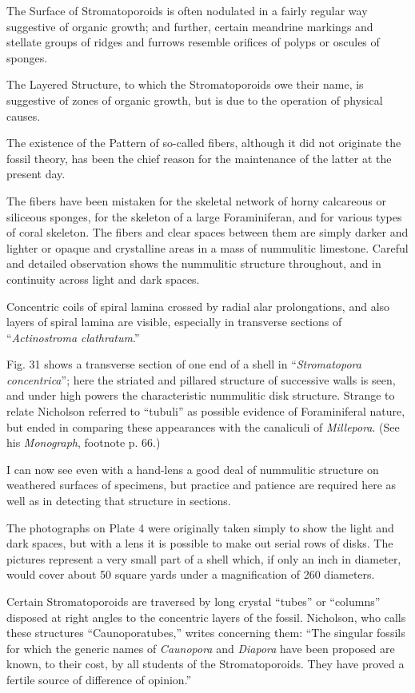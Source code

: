\documentclass[a4paper, 12pt, oneside]{article}
\begin{document}
The Surface of Stromatoporoids is often nodulated in a fairly regular way suggestive of organic growth; and further, certain meandrine markings and stellate groups of ridges and furrows resemble orifices of polyps or oscules of sponges.

The Layered Structure, to which the Stromatoporoids owe their name, is suggestive of zones of organic growth, but is due to the operation of physical causes.

The existence of the Pattern of so-called fibers, although it did not originate the fossil theory, has been the chief reason for the maintenance of the latter at the present day.

The fibers have been mistaken for the skeletal network of horny calcareous or siliceous sponges, for the skeleton of a large Foraminiferan, and for various types of coral skeleton. The fibers and clear spaces between them are simply darker and lighter or opaque and crystalline areas in a mass of nummulitic limestone. Careful and detailed observation shows the nummulitic structure throughout, and in continuity across light and dark spaces.

Concentric coils of spiral lamina crossed by radial alar prolongations, and also layers of spiral lamina are visible, especially in transverse sections of ``\emph{Actinostroma clathratum}.''

Fig. 31 shows a transverse section of one end of a shell in ``\emph{Stromatopora concentrica}''; here the striated and pillared structure of successive walls is seen, and under high powers the characteristic nummulitic disk structure. Strange to relate Nicholson referred to ``tubuli'' as possible evidence of Foraminiferal nature, but ended in comparing these appearances with the canaliculi of \emph{Millepora}. (See his \emph{Monograph}, footnote p. 66.)

I can now see even with a hand-lens a good deal of nummulitic structure on weathered surfaces of specimens, but practice and patience are required here as well as in detecting that structure in sections.

The photographs on Plate 4 were originally taken simply to show the light and dark spaces, but with a lens it is possible to make out serial rows of disks. The pictures represent a very small part of a shell which, if only an inch in diameter, would cover about 50 square yards under a magnification of 260 diameters.

Certain Stromatoporoids are traversed by long crystal ``tubes'' or ``columns'' disposed at right angles to the concentric layers of the fossil. Nicholson, who calls these structures ``Caunoporatubes,'' writes concerning them: ``The singular fossils for which the generic names of \emph{Caunopora} and \emph{Diapora} have been proposed are known, to their cost, by all students of the Stromatoporoids. They have proved a fertile source of difference of opinion.''
\end{document}
